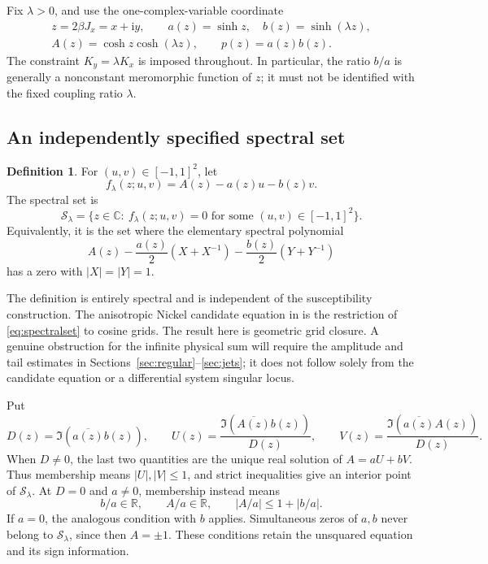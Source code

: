 \documentclass[11pt]{article}
\numberwithin{equation}{section}
\theoremstyle{definition}
\newtheorem{definition}[theorem]{Definition}
\newcommand{\C}{\mathbb C}
\newcommand{\R}{\mathbb R}
\newcommand{\ii}{\mathrm i}
\newcommand{\cS}{\mathcal S}
\begin{document}
Fix \(\lambda>0\), and use the one-complex-variable coordinate
\begin{gather*}
 z=2\beta J_x=x+\ii y,\qquad
 a(z)=\sinh z,\quad b(z)=\sinh(\lambda z),\\
 A(z)=\cosh z\cosh(\lambda z),\qquad p(z)=a(z)b(z).
\end{gather*}
The constraint \(K_y=\lambda K_x\) is imposed throughout. In particular,
the ratio \(b/a\) is generally a nonconstant meromorphic function of
\(z\); it must not be identified with the fixed coupling ratio
\(\lambda\).

\subsection{An independently specified spectral set}

\begin{definition}\label{def:spectralset}
For \((u,v)\in[-1,1]^2\), let
\[
 f_\lambda(z;u,v)=A(z)-a(z)u-b(z)v.
\]
The spectral set is
\begin{equation}\label{eq:spectralset}
 \cS_\lambda
 =\{z\in\C:\ f_\lambda(z;u,v)=0
                    \text{ for some }(u,v)\in[-1,1]^2\}.
\end{equation}
Equivalently, it is the set where the elementary spectral polynomial
\[
 A(z)-\frac{a(z)}2(X+X^{-1})
       -\frac{b(z)}2(Y+Y^{-1})
\]
has a zero with \(|X|=|Y|=1\).
\end{definition}

The definition is entirely spectral and is independent of the susceptibility
construction. The anisotropic Nickel candidate equation
in \cite[eq.~(54)]{BHM} is the restriction of
\eqref{eq:spectralset} to cosine grids. The result here is geometric grid closure. A genuine obstruction for the
infinite physical sum will require the amplitude and tail estimates in
Sections~\ref{sec:regular}--\ref{sec:jets}; it does not follow solely
from the candidate equation or a differential system singular locus.

Put
\begin{equation}\label{eq:cramerUV}
 D(z)=\Im(\overline{a(z)}b(z)),\qquad
 U(z)=\frac{\Im(\overline{A(z)}b(z))}{D(z)},\qquad
 V(z)=\frac{\Im(\overline{a(z)}A(z))}{D(z)}.
\end{equation}
When \(D\ne0\), the last two quantities are the unique real solution
of \(A=aU+bV\). Thus membership means \(|U|,|V|\le1\), and strict
inequalities give an interior point of \(\cS_\lambda\). At \(D=0\)
and \(a\ne0\), membership instead means
\[
 b/a\in\R,\qquad A/a\in\R,\qquad |A/a|\le1+|b/a|.
\]
If \(a=0\), the analogous condition with \(b\) applies. Simultaneous
zeros of \(a,b\) never belong to \(\cS_\lambda\), since then
\(A=\pm1\). These conditions retain the unsquared equation and its
sign information.
\end{document}
